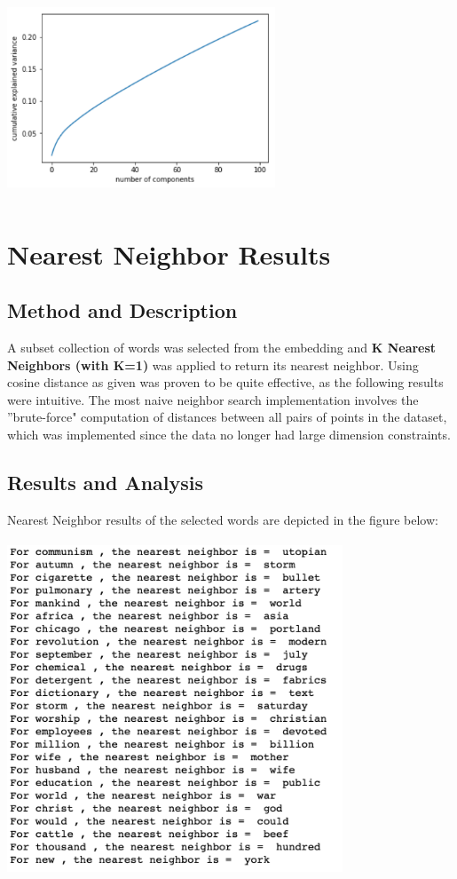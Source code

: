 \documentclass[12pt]{article}
\theoremstyle{plain}
\theoremstyle{definition}
\numberwithin{equation}{theorem}
\begin{document}
\begin{center}
\includegraphics[width=8cm, height=6cm]{pca_100}
\end{center}
\bigskip
\bigskip

\section{Nearest Neighbor Results}
\subsection{Method and Description}

A subset collection of words was selected from the embedding and \textbf{K Nearest Neighbors (with K=1)} was applied to return its nearest neighbor. Using cosine distance as given was proven to be quite effective, as the following results were intuitive. The most naive neighbor search implementation involves the ''brute-force" computation of distances between all pairs of points in the dataset, which was implemented since the data no longer had large dimension constraints.

\subsection{Results and Analysis}

Nearest Neighbor results of the selected words are depicted in the figure below:
\bigskip

\begin{center}
\includegraphics[width=10cm, height=10cm]{nn_100}
\end{center}
\bigskip
\end{document}
